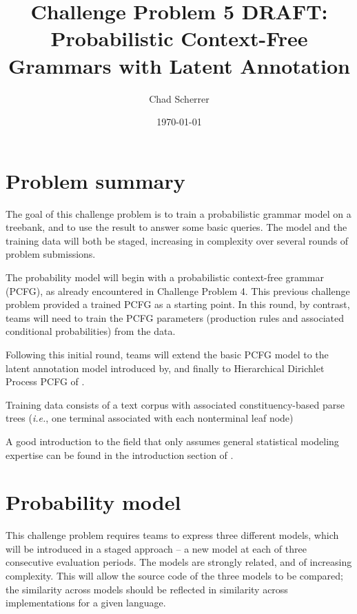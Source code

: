 \documentclass[english]{article}
\begin{document}
\title{Challenge Problem 5 DRAFT:\\
Probabilistic Context-Free Grammars with Latent Annotation}

\author{Chad Scherrer}

\date{\today}

\maketitle

\section{Problem summary}

The goal of this challenge problem is to train a probabilistic grammar model on a treebank, and to use the result to answer some basic queries. The model and the training data will both be staged, increasing in complexity over several rounds of problem submissions.

The probability model will begin with a probabilistic context-free grammar (PCFG), as already encountered in Challenge Problem 4. This previous challenge problem provided a trained PCFG as a starting point. In this round, by contrast, teams will need to train the PCFG parameters (production rules and associated conditional probabilities) from the data. 

Following this initial round, teams will extend the basic PCFG model to the latent annotation model introduced by\citet{Matsuzaki2005}, and finally to Hierarchical Dirichlet Process PCFG of \citet{Liang2007}.

Training data consists of a text corpus with associated constituency-based parse trees (\emph{i.e.}, one terminal associated with each nonterminal leaf node)

A good introduction to the field that only assumes general statistical modeling expertise can be found in the introduction section of \citet{Liang2009}.

\section{Probability model}

This challenge problem requires teams to express three different models, which will be introduced in a staged approach -- a new model at each of three consecutive evaluation periods. The models are strongly related, and of increasing complexity. This will allow the source code of the three models to be compared; the similarity across models should be reflected in similarity across implementations for a given language.
\end{document}
